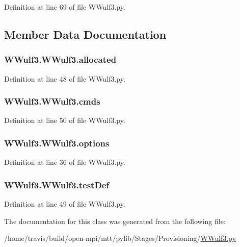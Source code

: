 Definition at line 69 of file W\-Wulf3.\-py.



\subsection{Member Data Documentation}
\hypertarget{class_w_wulf3_1_1_w_wulf3_ad83bab03cfcdab3a5b689a0958db19e8}{
\subsubsection[{allocated}]{\setlength{\rightskip}{0pt plus 5cm}W\-Wulf3.\-W\-Wulf3.\-allocated}}\label{class_w_wulf3_1_1_w_wulf3_ad83bab03cfcdab3a5b689a0958db19e8}


Definition at line 48 of file W\-Wulf3.\-py.

\hypertarget{class_w_wulf3_1_1_w_wulf3_afb4fb9db2456e29872155d9b8738418f}{
\subsubsection[{cmds}]{\setlength{\rightskip}{0pt plus 5cm}W\-Wulf3.\-W\-Wulf3.\-cmds}}\label{class_w_wulf3_1_1_w_wulf3_afb4fb9db2456e29872155d9b8738418f}


Definition at line 50 of file W\-Wulf3.\-py.

\hypertarget{class_w_wulf3_1_1_w_wulf3_adff5ffd43f8b68d49c7b45ab48d7b428}{
\subsubsection[{options}]{\setlength{\rightskip}{0pt plus 5cm}W\-Wulf3.\-W\-Wulf3.\-options}}\label{class_w_wulf3_1_1_w_wulf3_adff5ffd43f8b68d49c7b45ab48d7b428}


Definition at line 36 of file W\-Wulf3.\-py.

\hypertarget{class_w_wulf3_1_1_w_wulf3_a9e8732432df9211bd64454c4c0e04098}{
\subsubsection[{test\-Def}]{\setlength{\rightskip}{0pt plus 5cm}W\-Wulf3.\-W\-Wulf3.\-test\-Def}}\label{class_w_wulf3_1_1_w_wulf3_a9e8732432df9211bd64454c4c0e04098}


Definition at line 49 of file W\-Wulf3.\-py.



The documentation for this class was generated from the following file\-:\begin{DoxyCompactItemize}
\item 
/home/travis/build/open-\/mpi/mtt/pylib/\-Stages/\-Provisioning/\hyperlink{_w_wulf3_8py}{W\-Wulf3.\-py}\end{DoxyCompactItemize}
